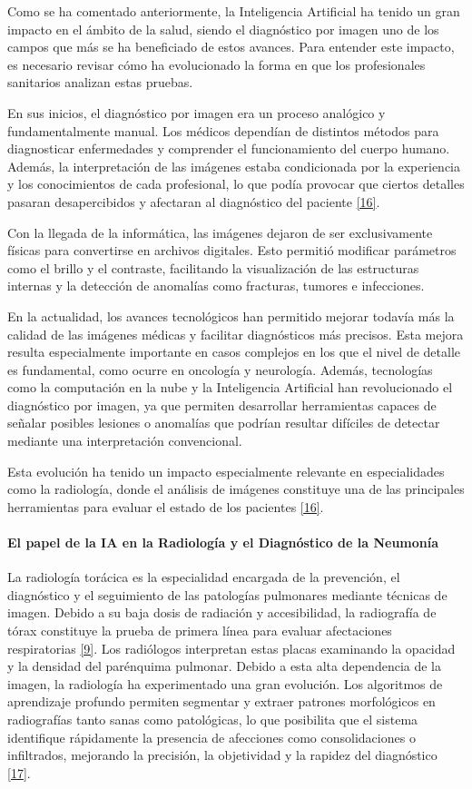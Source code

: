 \documentclass[11pt, a4paper]{article}
\numberwithin{equation}{section}
\begin{document}
Como se ha comentado anteriormente, la Inteligencia Artificial ha tenido un gran impacto en el ámbito de la salud, siendo el diagnóstico por imagen uno de los campos que más se ha beneficiado de estos avances. Para entender este impacto, es necesario revisar cómo ha evolucionado la forma en que los profesionales sanitarios analizan estas pruebas.

En sus inicios, el diagnóstico por imagen era un proceso analógico y fundamentalmente manual. Los médicos dependían de distintos métodos para diagnosticar enfermedades y comprender el funcionamiento del cuerpo humano. Además, la interpretación de las imágenes estaba condicionada por la experiencia y los conocimientos de cada profesional, lo que podía provocar que ciertos detalles pasaran desapercibidos y afectaran al diagnóstico del paciente \hyperlink{ref:16}{[16]}.

Con la llegada de la informática, las imágenes dejaron de ser exclusivamente físicas para convertirse en archivos digitales. Esto permitió modificar parámetros como el brillo y el contraste, facilitando la visualización de las estructuras internas y la detección de anomalías como fracturas, tumores e infecciones.

En la actualidad, los avances tecnológicos han permitido mejorar todavía más la calidad de las imágenes médicas y facilitar diagnósticos más precisos. Esta mejora resulta especialmente importante en casos complejos en los que el nivel de detalle es fundamental, como ocurre en oncología y neurología. Además, tecnologías como la computación en la nube y la Inteligencia Artificial han revolucionado el diagnóstico por imagen, ya que permiten desarrollar herramientas capaces de señalar posibles lesiones o anomalías que podrían resultar difíciles de detectar mediante una interpretación convencional.

Esta evolución ha tenido un impacto especialmente relevante en especialidades como la radiología, donde el análisis de imágenes constituye una de las principales herramientas para evaluar el estado de los pacientes \hyperlink{ref:16}{[16]}.

\paragraph{El papel de la IA en la Radiología y el Diagnóstico de la Neumonía}

La radiología torácica es la especialidad encargada de la prevención, el diagnóstico y el seguimiento de las patologías pulmonares mediante técnicas de imagen. Debido a su baja dosis de radiación y accesibilidad, la radiografía de tórax constituye la prueba de primera línea para evaluar afectaciones respiratorias \hyperlink{ref:9}{[9]}. Los radiólogos interpretan estas placas examinando la opacidad y la densidad del parénquima pulmonar. Debido a esta alta dependencia de la imagen, la radiología ha experimentado una gran evolución. Los algoritmos de aprendizaje profundo permiten segmentar y extraer patrones morfológicos en radiografías tanto sanas como patológicas, lo que posibilita que el sistema identifique rápidamente la presencia de afecciones como consolidaciones o infiltrados, mejorando la precisión, la objetividad y la rapidez del diagnóstico \hyperlink{ref:17}{[17]}.
\end{document}

